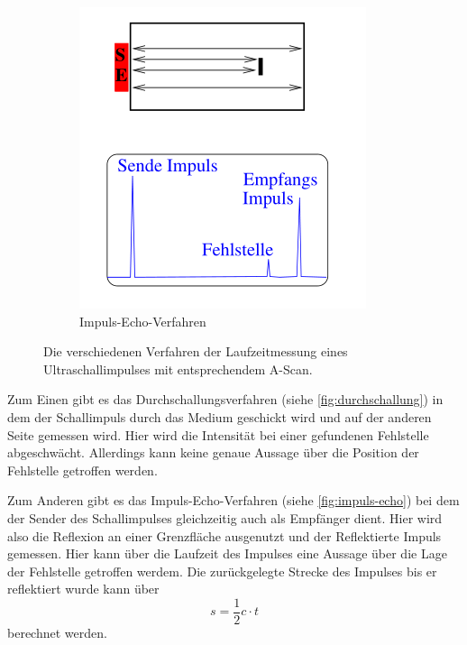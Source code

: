 \begin{figure}
\begin{subfigure}{0.3\textwidth}
        \includegraphics[width=\textwidth]{images/bild02.png}
        \caption{Impuls-Echo-Verfahren}
        \label{fig:impuls-echo}
    \end{subfigure}
    \caption{Die verschiedenen Verfahren der Laufzeitmessung eines Ultraschallimpulses mit entsprechendem A-Scan.\cite{US1}}
    \label{fig:verfahren}
\end{figure}

Zum Einen gibt es das Durchschallungsverfahren (siehe \autoref{fig:durchschallung}) in dem der Schallimpuls durch das Medium geschickt wird und auf der anderen Seite gemessen wird.
Hier wird die Intensität bei einer gefundenen Fehlstelle abgeschwächt. 
Allerdings kann keine genaue Aussage über die Position der Fehlstelle getroffen werden.

Zum Anderen gibt es das Impuls-Echo-Verfahren (siehe \autoref{fig:impuls-echo}) bei dem der Sender des Schallimpulses gleichzeitig auch als Empfänger dient.
Hier wird also die Reflexion an einer Grenzfläche ausgenutzt und der Reflektierte Impuls gemessen.
Hier kann über die Laufzeit des Impulses eine Aussage über die Lage der Fehlstelle getroffen werdem.
Die zurückgelegte Strecke des Impulses bis er reflektiert wurde kann über
\begin{equation}
    s = \frac{1}{2} c \cdot t
    \label{eq:strecke}
\end{equation}
berechnet werden.

